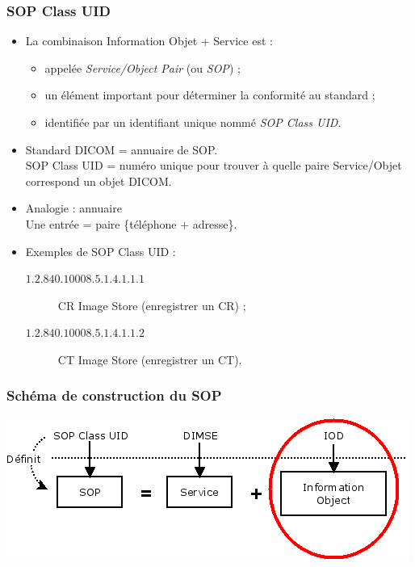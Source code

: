 	\frame
	{
		\frametitle{SOP Class UID}

		\begin{itemize}
			\item La combinaison Information Objet + Service est :
			\begin{itemize}
				\item appel\'ee \emph{Service/Object Pair} (ou \emph{SOP}) ;
				\item un \'el\'ement important pour d\'eterminer la conformit\'e au standard ;
				\item identifi\'ee par un identifiant unique nomm\'e \emph{SOP Class UID}.
			\end{itemize}
		
			\item Standard DICOM = annuaire de SOP.\\
			SOP Class UID = num\'ero unique pour trouver \`a quelle paire Service/Objet correspond un objet DICOM.
			\item Analogie : annuaire\\
			Une entr\'ee = paire \{t\'el\'ephone $+$ adresse\}.
			\item Exemples de SOP Class UID :
			\begin{description}
				\item[$1.2.840.10008.5.1.4.1.1.1$] CR Image Store (enregistrer un CR) ;
				\item[$1.2.840.10008.5.1.4.1.1.2$] CT Image Store (enregistrer un CT).
			\end{description}
		\end{itemize}
	}
	
	\frame
	{
		\frametitle{Sch\'ema de construction du SOP}
		\begin{center}
			\includegraphics[width=\linewidth]{./figures/sop-definition-IOD.png}
		\end{center}		
	}

